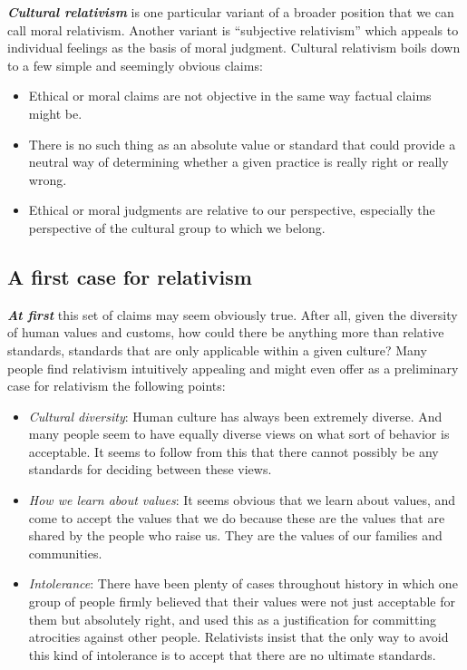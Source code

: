 \documentclass[]{book}
\providecommand{\tightlist}{%
  \setlength{\itemsep}{0pt}\setlength{\parskip}{0pt}}
\begin{document}
\textbf{\emph{Cultural relativism}} is one particular variant of a broader position that we can call moral relativism. Another variant is ``subjective relativism'' which appeals to individual feelings as the basis of moral judgment. Cultural relativism boils down to a few simple and seemingly obvious claims:

\begin{itemize}
\tightlist
\item
  Ethical or moral claims are not objective in the same way factual claims might be.
\item
  There is no such thing as an absolute value or standard that could provide a neutral way of determining whether a given practice is really right or really wrong.
\item
  Ethical or moral judgments are relative to our perspective, especially the perspective of the cultural group to which we belong.
\end{itemize}

\hypertarget{a-first-case-for-relativism}{%
\subsection*{A first case for relativism}\label{a-first-case-for-relativism}}


\textbf{\emph{At first}} this set of claims may seem obviously true. After all, given the diversity of human values and customs, how could there be anything more than relative standards, standards that are only applicable within a given culture? Many people find relativism intuitively appealing and might even offer as a preliminary case for relativism the following points:

\begin{itemize}
\tightlist
\item
  \emph{Cultural diversity}: Human culture has always been extremely diverse. And many people seem to have equally diverse views on what sort of behavior is acceptable. It seems to follow from this that there cannot possibly be any standards for deciding between these views.
\item
  \emph{How we learn about values}: It seems obvious that we learn about values, and come to accept the values that we do because these are the values that are shared by the people who raise us. They are the values of our families and communities.
\item
  \emph{Intolerance}: There have been plenty of cases throughout history in which one group of people firmly believed that their values were not just acceptable for them but absolutely right, and used this as a justification for committing atrocities against other people. Relativists insist that the only way to avoid this kind of intolerance is to accept that there are no ultimate standards.
\end{itemize}
\end{document}
